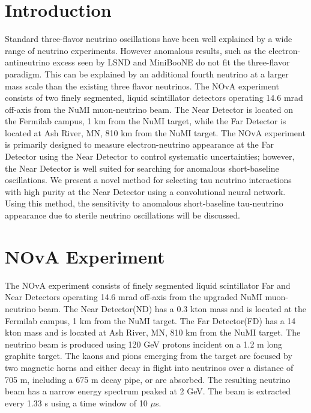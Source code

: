 \documentclass[12pt]{article}
\begin{document}
\section{Introduction}
Standard three-flavor neutrino oscillations have been well explained by a wide range of neutrino experiments. However anomalous results, such as the electron-antineutrino excess seen by LSND and MiniBooNE do not fit the three-flavor paradigm. This can be explained by an additional fourth neutrino at a larger mass scale than the existing three flavor neutrinos. The NOvA experiment consists of two finely segmented, liquid scintillator detectors operating  14.6 mrad off-axis from the NuMI muon-neutrino beam. The Near Detector is located on the Fermilab campus, 1 km from the NuMI target, while the Far Detector is located at Ash River, MN, 810 km from the NuMI target. The NOvA experiment is primarily designed to measure electron-neutrino appearance at the Far Detector using the Near Detector to control systematic uncertainties; however, the Near Detector is well suited for searching for anomalous short-baseline oscillations. We present a novel method for selecting tau neutrino interactions with high purity at the Near Detector using a convolutional neural network. Using this method, the sensitivity to anomalous short-baseline tau-neutrino appearance due to sterile neutrino oscillations will be discussed.

\section{NOvA Experiment}
The NOvA experiment consists of finely segmented  liquid scintillator Far and Near Detectors operating 14.6 mrad off-axis from the upgraded NuMI muon-neutrino beam. The Near Detector(ND) has a 0.3 kton mass and is located at the Fermilab campus, 1 km from the NuMI target. The Far Detector(FD) has a 14 kton mass and is located at Ash River, MN, 810 km from the NuMI target. The neutrino beam is produced using 120 GeV protons incident on a 1.2 m long graphite target. The kaons and pions emerging from the target are focused by two magnetic horns and either decay in flight into neutrinos over a distance of 705 m, including a 675 m decay pipe, or are absorbed. The resulting neutrino beam has a narrow energy spectrum peaked at 2 GeV. The beam is extracted every 1.33 s using a time window of 10 $\mu$s. 
%
%
\end{document}
